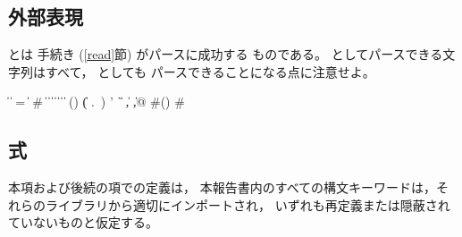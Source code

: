 \subsection{外部表現}
\label{datumsyntax}

 とは  手続き (\ref{read}節) がパースに成功する
ものである。
 としてパースできる文字列はすべて， としても
パースできることになる点に注意せよ。\label{datum}

\begin{grammar}%
 \:  \| 
\>  \|  =  \|  \#
 \:  \| 
\>  \|  \|  \|   \| 
 \: 
 \:  \|  \| 
 \: () \| ( .\ )
 \:  
 \: ' \| ` \| , \| ,@
 \: \#()
 \: \# %
\end{grammar}


\subsection{式}

本項および後続の項での定義は，
本報告書内のすべての構文キーワードは，それらのライブラリから適切にインポートされ，
いずれも再定義または隠蔽されていないものと仮定する。

